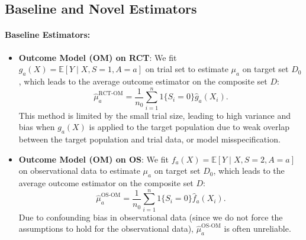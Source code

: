\documentclass[12pt, oneside]{amsart}
\theoremstyle{definition}
\theoremstyle{remark}
\numberwithin{equation}{section}
\begin{document}
\subsection{Baseline and Novel Estimators}
\paragraph{Baseline Estimators:}
\begin{itemize}
    \item \textbf{Outcome Model (OM) on RCT}: We fit $g_a(X) = \mathbb{E}[Y \mid X, S = 1, A = a]$ on trial set to estimate $\mu_a$ on target set $D_{0}$, which leads to the average outcome estimator on the composite set $D$:
    $$
    \hat{\mu}_a^{\text{RCT-OM}} = \frac{1}{n_0} \sum_{i=1}^{n} 1 \{S_i = 0\} \hat{g}_a(X_i).
    $$
This method is limited by the small trial size, leading to high variance and bias when $g_a(X)$ is applied to the target population due to weak overlap between the target population and trial data, or model misspecification.
    
    \item \textbf{Outcome Model (OM) on OS}: We fit $f_a(X) = \mathbb{E}[Y \mid X, S = 2, A = a]$ on observational data to estimate $\mu_a$ on target set $D_{0}$, which leads to the average outcome estimator on the composite set $D$:
    $$
    \hat{\mu}_a^{\text{OS-OM}} = \frac{1}{n_0} \sum_{i=1}^{n} 1 \{S_i = 0\} \hat{f}_a(X_i).
    $$
Due to confounding bias in observational data (since we do not force the assumptions to hold for the observational data), $\hat{\mu}_a^{\text{OS-OM}}$ is often unreliable.
\end{itemize}
\end{document}
